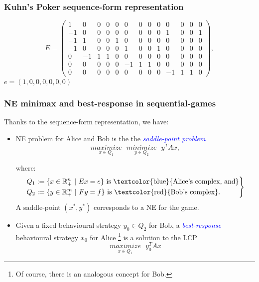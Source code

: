 \documentclass[xcolor=dvipsnames]{beamer}
\begin{document}
\begin{frame}
  \frametitle{Kuhn's Poker sequence-form representation}
  \[   E = \left( \begin{array}{ccccccccccccc}
1&0&0&0&0&0&0&0&0&0&0&0&0\\-1&0&0&0&0&0&0&0&0&1&0&0&1\\-1&1&0&0&1&0&0&0&0&0&0&0&0\\-1&0&0&0&0&1&0&0&1&0&0&0&0\\0&-1&1&1&0&0&0&0&0&0&0&0&0\\0&0&0&0&0&-1&1&1&0&0&0&0&0\\0&0&0&0&0&0&0&0&0&-1&1&1&0
\end{array} \right),\]
  $e = (1, 0, 0, 0, 0, 0, 0)$

\end{frame}

\begin{frame}
  \frametitle{NE minimax and best-response in sequential-games}
Thanks to the sequence-form representation, we have:
\begin{itemize}[<+->]
\item NE problem for Alice and Bob is the the \textit{\textcolor{blue}{saddle-point problem}}
  \begin{equation}
    \underset{x \in Q_1}{maximize}\text{ }\underset{y \in Q_2}{minimize}\text{ }y^TAx,
    \label{eq:minimax_stengel}
  \end{equation}
  
    where:
   \begin{equation}
     \left .
     \begin{split}
       Q_1 &:= \{x \in \mathbb{R}_+^n\text{ }|\text{ }Ex=e\} \text{ is \textcolor{blue}{Alice's complex, and}}\\
       Q_2 &:= \{y \in \mathbb{R}_+^m\text{ }|\text{ }Fy=f\} \text{ is \textcolor{red}{Bob's complex}.}
     \end{split}
      \right\}
   \end{equation}
   A saddle-point $(x^*, y^*)$ corresponds to a NE for the game.
   \item Given a fixed behavioural strategy $y_0 \in Q_2$ for Bob, a \textit{\textcolor{blue}{best-response}} behavioural strategy $x_0$ for Alice
     \footnote{Of course, there is an analogous concept for Bob.}
    is a solution to the LCP
    \begin{equation}
      \underset{x\in Q_1}{maximize}\text{ }{y_0^TAx}
    \end{equation}
  \end{itemize}
\end{frame}
      
\end{document}
